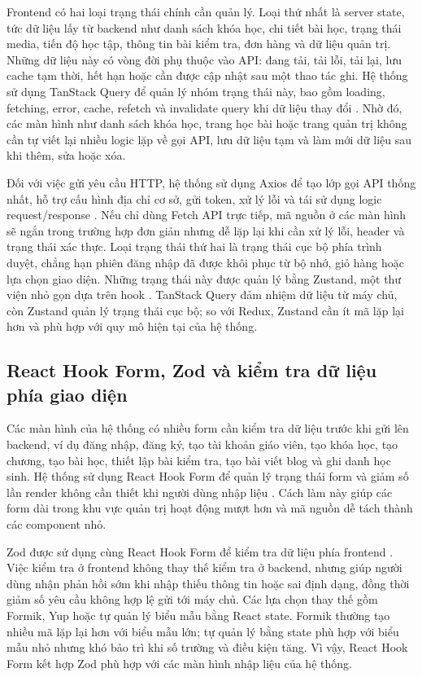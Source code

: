 \documentclass[../DoAn.tex]{subfiles}
\begin{document}
Frontend có hai loại trạng thái chính cần quản lý. Loại thứ nhất là server state, tức dữ liệu lấy từ backend như danh sách khóa học, chi tiết bài học, trạng thái media, tiến độ học tập, thông tin bài kiểm tra, đơn hàng và dữ liệu quản trị. Những dữ liệu này có vòng đời phụ thuộc vào API: đang tải, tải lỗi, tải lại, lưu cache tạm thời, hết hạn hoặc cần được cập nhật sau một thao tác ghi. Hệ thống sử dụng TanStack Query để quản lý nhóm trạng thái này, bao gồm loading, fetching, error, cache, refetch và invalidate query khi dữ liệu thay đổi \cite{tanstack_query_docs}. Nhờ đó, các màn hình như danh sách khóa học, trang học bài hoặc trang quản trị không cần tự viết lại nhiều logic lặp về gọi API, lưu dữ liệu tạm và làm mới dữ liệu sau khi thêm, sửa hoặc xóa.

Đối với việc gửi yêu cầu HTTP, hệ thống sử dụng Axios để tạo lớp gọi API thống nhất, hỗ trợ cấu hình địa chỉ cơ sở, gửi token, xử lý lỗi và tái sử dụng logic request/response \cite{axios_docs}. Nếu chỉ dùng Fetch API trực tiếp, mã nguồn ở các màn hình sẽ ngắn trong trường hợp đơn giản nhưng dễ lặp lại khi cần xử lý lỗi, header và trạng thái xác thực. Loại trạng thái thứ hai là trạng thái cục bộ phía trình duyệt, chẳng hạn phiên đăng nhập đã được khôi phục từ bộ nhớ, giỏ hàng hoặc lựa chọn giao diện. Những trạng thái này được quản lý bằng Zustand, một thư viện nhỏ gọn dựa trên hook \cite{zustand_docs}. TanStack Query đảm nhiệm dữ liệu từ máy chủ, còn Zustand quản lý trạng thái cục bộ; so với Redux, Zustand cần ít mã lặp lại hơn và phù hợp với quy mô hiện tại của hệ thống.

\subsection{React Hook Form, Zod và kiểm tra dữ liệu phía giao diện}
\label{subsection:3.2.3}

Các màn hình của hệ thống có nhiều form cần kiểm tra dữ liệu trước khi gửi lên backend, ví dụ đăng nhập, đăng ký, tạo tài khoản giáo viên, tạo khóa học, tạo chương, tạo bài học, thiết lập bài kiểm tra, tạo bài viết blog và ghi danh học sinh. Hệ thống sử dụng React Hook Form để quản lý trạng thái form và giảm số lần render không cần thiết khi người dùng nhập liệu \cite{react_hook_form_docs}. Cách làm này giúp các form dài trong khu vực quản trị hoạt động mượt hơn và mã nguồn dễ tách thành các component nhỏ.

Zod được sử dụng cùng React Hook Form để kiểm tra dữ liệu phía frontend \cite{zod_docs}. Việc kiểm tra ở frontend không thay thế kiểm tra ở backend, nhưng giúp người dùng nhận phản hồi sớm khi nhập thiếu thông tin hoặc sai định dạng, đồng thời giảm số yêu cầu không hợp lệ gửi tới máy chủ. Các lựa chọn thay thế gồm Formik, Yup hoặc tự quản lý biểu mẫu bằng React state. Formik thường tạo nhiều mã lặp lại hơn với biểu mẫu lớn; tự quản lý bằng state phù hợp với biểu mẫu nhỏ nhưng khó bảo trì khi số trường và điều kiện tăng. Vì vậy, React Hook Form kết hợp Zod phù hợp với các màn hình nhập liệu của hệ thống.
\end{document}
